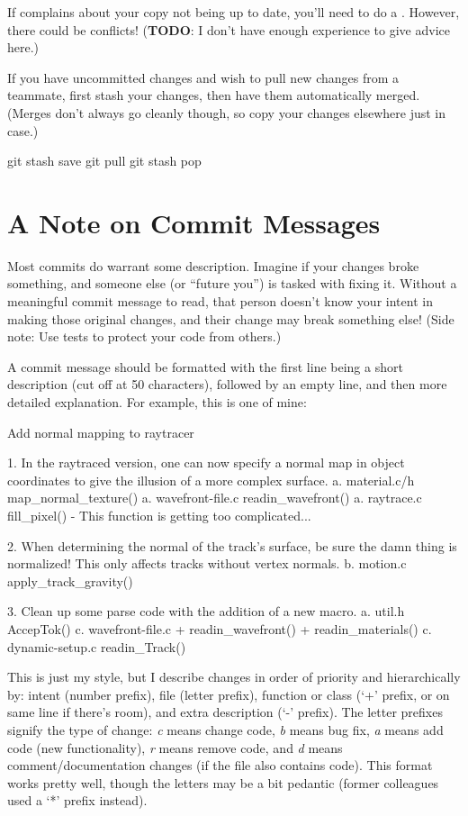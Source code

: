 If  complains about your copy not being up to date, you'll need to do a .
However, there could be conflicts!
(\textbf{TODO}: I don't have enough experience to give advice here.)

If you have uncommitted changes and wish to pull new changes from a teammate, first stash your changes, then have them automatically merged.
(Merges don't always go cleanly though, so copy your changes elsewhere just in case.)
\begin{code}
git stash save
git pull
git stash pop
\end{code}

\section{A Note on Commit Messages}
Most commits do warrant some description.
Imagine if your changes broke something, and someone else (or ``future you'') is tasked with fixing it.
Without a meaningful commit message to read, that person doesn't know your intent in making those original changes, and their change may break something else!
(Side note: Use tests to protect your code from others.)

A commit message should be formatted with the first line being a short description (cut off at 50 characters), followed by an empty line, and then more detailed explanation.
For example, this is one of mine:
\begin{code}
Add normal mapping to raytracer

1. In the raytraced version, one can now specify a normal map in
   object coordinates to give the illusion of a more complex surface.
  a. material.c/h  map_normal_texture()
  a. wavefront-file.c  readin_wavefront()
  a. raytrace.c  fill_pixel()
     - This function is getting too complicated...

2. When determining the normal of the track's surface, be sure the damn
   thing is normalized! This only affects tracks without vertex normals.
  b. motion.c  apply_track_gravity()

3. Clean up some parse code with the addition of a new macro.
  a. util.h  AccepTok()
  c. wavefront-file.c
    + readin_wavefront()
    + readin_materials()
  c. dynamic-setup.c  readin_Track()
\end{code}
This is just my style, but I describe changes in order of priority and hierarchically by: intent (number prefix), file (letter prefix), function or class (`+' prefix, or on same line if there's room), and extra description (`-' prefix).
The letter prefixes signify the type of change: \textit{c} means change code, \textit{b} means bug fix, \textit{a} means add code (new functionality), \textit{r} means remove code, and \textit{d} means comment/documentation changes (if the file also contains code).
This format works pretty well, though the letters may be a bit pedantic (former colleagues used a `*' prefix instead).



